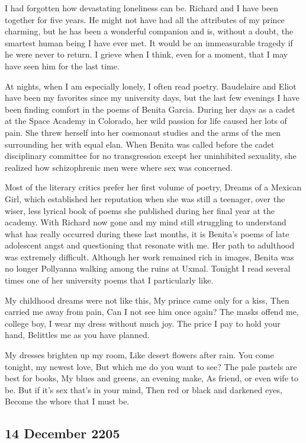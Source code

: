 \documentclass[]{article}
\begin{document}
I had forgotten how devastating loneliness can be.  Richard and I have been together for five years.  He might not have had all the attributes of my prince charming, but he has been a wonderful companion and is, without a doubt, the smartest human being I have ever met.  It would be an immeasurable tragedy if he were never to return.  I grieve when I think, even for a moment, that I may have seen him for the last time.

At nights, when I am especially lonely, I often read poetry.  Baudelaire and Eliot have been my favorites since my university days, but the last few evenings I have been finding comfort in the poems of Benita Garcia.  During her days as a cadet at the Space Academy in Colorado, her wild passion for life caused her lots of pain.  She threw herself into her cosmonaut studies and the arms of the men surrounding her with equal elan.  When Benita was called before the cadet disciplinary committee for no transgression except her uninhibited sexuality, she realized how schizophrenic men were where sex was concerned.

Most of the literary critics prefer her first volume of poetry, Dreams of a Mexican Girl, which established her reputation when she was still a teenager, over the wiser, less lyrical book of poems she published during her final year at the academy.  With Richard now gone and my mind still struggling to understand what has really occurred during these last months, it is Benita’s poems of late adolescent angst and questioning that resonate with me.  Her path to adulthood was extremely difficult.  Although her work remained rich in images, Benita was no longer Pollyanna walking among the ruins at Uxmal.  Tonight I read several times one of her university poems that I particularly like.

My childhood dreams were not like this, My prince came only for a kiss, Then carried me away from pain, Can I not see him once again? The masks offend me, college boy, I wear my dress without much joy.  The price I pay to hold your hand, Belittles me as you have planned.

My dresses brighten up my room, Like desert flowers after rain.  You come tonight, my newest love, But which me do you want to see? The pale pastels are best for books, My blues and greens, an evening make, As friend, or even wife to be.  But if it’s sex that’s in your mind, Then red or black and darkened eyes, Become the whore that I must be.

\subsection*{14 December 2205}
\end{document}
